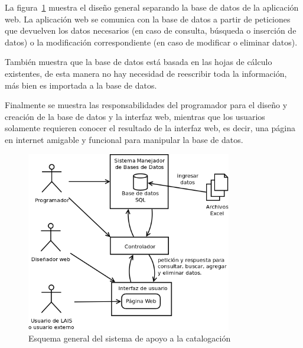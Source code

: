\documentclass[10pt,letterpaper]{article}
\begin{document}
La figura~\ref{fig:esquema_general} muestra el diseño general separando la base de datos de la aplicación web. La aplicación web se comunica con la base de datos a partir de peticiones que devuelven los datos necesarios (en caso de consulta, búsqueda o inserción de datos) o la modificación correspondiente (en caso de modificar o eliminar datos).

También muestra que la base de datos está basada en las hojas de cálculo existentes, de esta manera no hay necesidad de reescribir toda la información, más bien es importada a la base de datos.

Finalmente se muestra las responsabilidades del programador para el diseño y creación de la base de datos y la interfaz web, mientras que los usuarios solamente requieren conocer el resultado de la interfaz web, es decir, una página en internet amigable y funcional para manipular la base de datos.

\begin{figure}[H]
	\centering
	\includegraphics[width=0.8\textwidth]{EsquemaGeneral.png}
	\caption{Esquema general del sistema de apoyo a la catalogación}
	\label{fig:esquema_general}
\end{figure}
\end{document}
